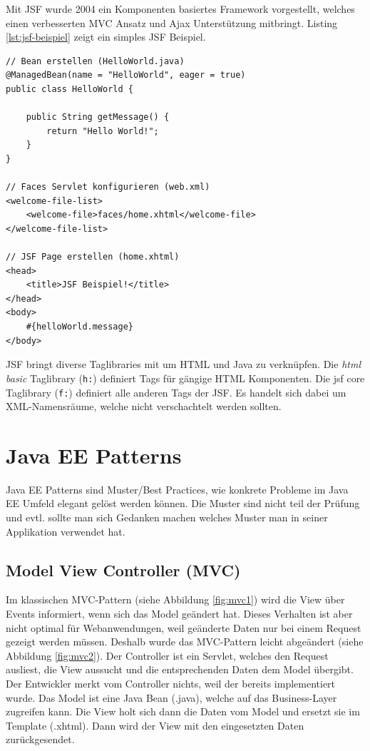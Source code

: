 Mit JSF wurde 2004 ein Komponenten basiertes Framework vorgestellt, welches einen verbesserten MVC Ansatz und Ajax Unterstützung mitbringt. Listing \ref{lst:jsf-beispiel} zeigt ein simples JSF Beispiel.

\begin{lstlisting}[caption=JSF Beispiel, label=lst:jsf-beispiel]
// Bean erstellen (HelloWorld.java)
@ManagedBean(name = "HelloWorld", eager = true)
public class HelloWorld {

	public String getMessage() {
		return "Hello World!";
	}
}

// Faces Servlet konfigurieren (web.xml)
<welcome-file-list>
	<welcome-file>faces/home.xhtml</welcome-file>
</welcome-file-list>

// JSF Page erstellen (home.xhtml)
<head>
	<title>JSF Beispiel!</title>
</head>
<body>
	#{helloWorld.message}
</body>
\end{lstlisting}

JSF bringt diverse Taglibraries mit um HTML und Java zu verknüpfen. Die \textit{html basic} Taglibrary (\verb|h:|) definiert Tags für gängige HTML Komponenten. Die jsf core Taglibrary (\verb|f:|) definiert alle anderen Tags der JSF. Es handelt sich dabei um XML-Namensräume, welche nicht verschachtelt werden sollten.

\section{Java EE Patterns}
Java EE Patterns sind Muster/Best Practices, wie konkrete Probleme im Java EE Umfeld elegant gelöst werden können. Die Muster sind nicht teil der Prüfung und evtl. sollte man sich Gedanken machen welches Muster man in seiner Applikation verwendet hat.

\subsection{Model View Controller (MVC)}

Im klassischen MVC-Pattern (siehe Abbildung \ref{fig:mvc1}) wird die View über Events informiert, wenn sich das Model geändert hat. Dieses Verhalten ist aber nicht optimal für Webanwendungen, weil geänderte Daten nur bei einem Request gezeigt werden müssen. Deshalb wurde das MVC-Pattern leicht abgeändert (siehe Abbildung \ref{fig:mvc2}). Der Controller ist ein Servlet, welches den Request ausliest, die View aussucht und die entsprechenden Daten dem Model übergibt. Der Entwickler merkt vom Controller nichts, weil der bereits implementiert wurde. Das Model ist eine Java Bean (.java), welche auf das Business-Layer zugreifen kann. Die View holt sich dann die Daten vom Model und ersetzt sie im Template (.xhtml). Dann wird der View mit den eingesetzten Daten zurückgesendet.

